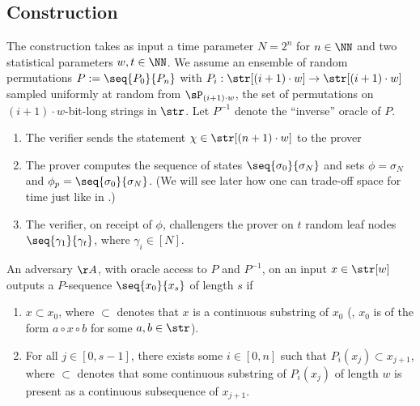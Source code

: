 \documentclass[a4paper,12pt]{article}
\begin{document}
  \subsection{Construction}
    The construction takes as input a time parameter $N=2^n$ for $n\in\NN$ and two statistical parameters $w,t\in\NN$. We assume an ensemble of random permutations $P:=\seq{P_0}{P_n}$ with $P_i:\str[(i+1)\cdot w]\to\str[(i+1)\cdot w]$ sampled uniformly at random from $\sP_{(i+1)\cdot w}$, the set of permutations on $(i+1)\cdot w$-bit-long strings in $\str$. Let $P^{-1}$ denote the ``inverse'' oracle of $P$.
    \begin{enumerate}
      \item The verifier sends the statement $\chi\in\str[(n+1)\cdot w]$ to the prover
      \item The prover computes the sequence of states $\seq{\sigma_0}{\sigma_N}$ and sets $\phi=\sigma_N$ and $\phi_p=\seq{\sigma_0}{\sigma_N}$. (We will see later how one can trade-off space for time just like in \cite{CP18}.)
      \item The verifier, on receipt of $\phi$, challengers the prover on $t$ random leaf nodes $\seq{\gamma_1}{\gamma_t}$, where $\gamma_i\in[N]$.
    \end{enumerate}
    
    \begin{definition}
      An adversary $\AA$, with oracle access to $P$ and $P^{-1}$, on an input $x\in\str[w]$ outputs a $P$-sequence $\seq{x_0}{x_s}$ of length $s$ if 
	\begin{enumerate}
	  \item $x\subset x_0$, where $\subset$ denotes that $x$ is a continuous substring of $x_0$ (\ie, $x_0$ is of the form $a\circ x \circ b$ for some $a,b\in\str$).
	  \item For all $j\in[0,s-1]$, there exists some $i\in[0,n]$ such that $P_i(x_j)\subset x_{j+1}$, where $\subset$ denotes that some continuous substring of $P_i(x_j)$ of length $w$ is present as a continuous subsequence of $x_{j+1}$.
	\end{enumerate}
    \end{definition}
    
\end{document}
